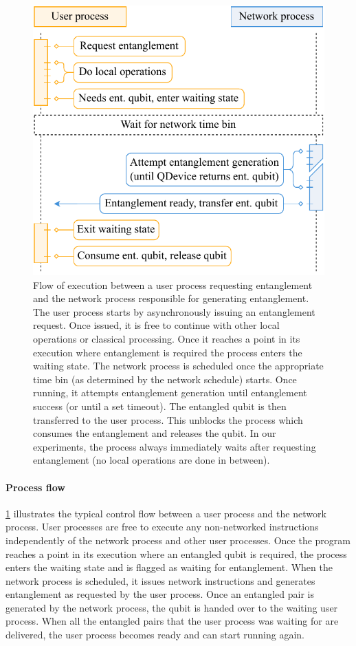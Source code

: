 \begin{figure}
\centering
\includegraphics[width=\linewidth]{figures/qnodeos/supplementary/process-flow.pdf}
\caption{Flow of execution between a user process requesting entanglement and the network process responsible for generating entanglement. The user process starts by asynchronously issuing an entanglement request. Once issued, it is free to continue with other local operations or classical processing. Once it reaches a point in its execution where entanglement is required the process enters the waiting state. The network process is scheduled once the appropriate time bin (as determined by the network schedule) starts. Once running, it attempts entanglement generation until entanglement success (or until a set timeout). The entangled qubit is then transferred to the user process. This unblocks the process which consumes the entanglement and releases the qubit. In our experiments, the process always immediately waits after requesting entanglement (no local operations are done in between).}
\label{qnodeos:fig:process-flow}
\end{figure}

\paragraph{Process flow}

\cref{qnodeos:fig:process-flow} illustrates the typical control flow between a user process and the network process. User processes are free to execute any non-networked instructions independently of the network process and other user processes. Once the program reaches a point in its execution where an entangled qubit is required, the process enters the waiting state and is flagged as waiting for entanglement. When the network process is scheduled, it issues network instructions and generates entanglement as requested by the user process. Once an entangled pair is generated by the network process, the qubit is handed over to the waiting user process. When all the entangled pairs that the user process was waiting for are delivered, the user process becomes ready and can start running again.

